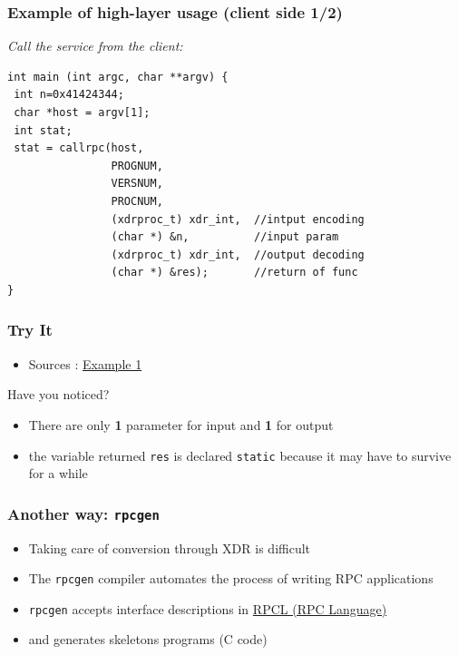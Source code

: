 \documentclass[bigger,hyperref={colorlinks=true, urlcolor=red, plainpages=false, pdfpagelabels, bookmarksnumbered}]{beamer}
\begin{document}
\begin{frame}[fragile]
\frametitle{Example of high-layer usage (client side 1/2)}
\label{sec-2-13}

   \emph{Call the service from the client:}

\lstset{language=C}
\begin{lstlisting}
int main (int argc, char **argv) {
 int n=0x41424344;
 char *host = argv[1];
 int stat;
 stat = callrpc(host,
                PROGNUM,
                VERSNUM,
                PROCNUM,
                (xdrproc_t) xdr_int,  //intput encoding
                (char *) &n,          //input param
                (xdrproc_t) xdr_int,  //output decoding
                (char *) &res);       //return of func
}
\end{lstlisting}
 
\end{frame}
\begin{frame}
\frametitle{Try It}
\label{sec-2-14}

\begin{itemize}
\item Sources : \href{http://icps.u-strasbg.fr/~genaud/courses/sd/src/rpc/example_1.tar.gz}{Example 1}
\end{itemize}
 
Have you noticed? 
\begin{itemize}
\item There are only \textbf{1} parameter for input and \textbf{1} for output
\item the variable returned \texttt{res} is declared \texttt{static} because it may have to survive for a while
\end{itemize}
\end{frame}
\begin{frame}
\frametitle{Another way: \texttt{rpcgen}}
\label{sec-2-15}

\begin{itemize}
\item Taking care of conversion through XDR is difficult
\item The \texttt{rpcgen} compiler automates the process of writing RPC applications
\item \texttt{rpcgen} accepts interface descriptions in \href{http://docs.oracle.com/cd/E19683-01/816-1435/6m7rrfn9k/index.html}{RPCL (RPC Language)}
\item and generates skeletons programs (C code)
\end{itemize}
\end{frame}
\end{document}
